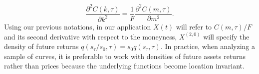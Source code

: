 \begin{equation}\label{q}
\frac{\partial^2 C(k,\tau)}{\partial k^2}=\frac{1}{F}\frac{\partial^2 C(m,\tau)}{\partial m^2}.
\end{equation}
Using our previous notations, in our application $X(t)$ will refer to $C(m,\tau)/F$ and its second derivative with respect to the moneyness, $X^{(2,0)}$ will specify the density of future returns $q(s_{\tau}/s_0,\tau)=s_0q(s_{\tau},\tau)$. %
In practice, when analyzing a sample of curves, it is preferable to work with densities of future assets returns rather than prices because the underlying functions become location invariant. %



